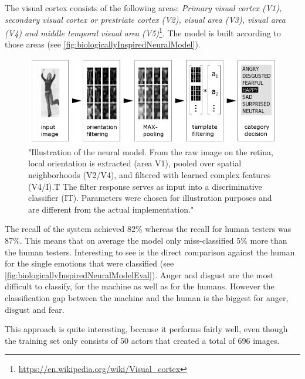 \documentclass[conference]{IEEEtran}
\begin{document}
The visual cortex consists of the following areas: \emph{Primary visual cortex (V1), secondary visual cortex or prestriate cortex (V2), visual area (V3), visual area (V4) and middle temporal visual area (V5)}\footnote{\url{https://en.wikipedia.org/wiki/Visual_cortex}}. The model is built according to those areas (see \autoref{fig:biologicallyInspiredNeuralModel}). 
\begin{figure}[H]
\centering
\includegraphics[width=\linewidth]{biologicallyInspiredNeuralModel.jpg}
\caption{"Illustration of the neural model. From the raw image on the retina, local orientation is extracted (area V1), pooled over spatial neighborhoods (V2/V4), and filtered with learned complex features (V4/I).T The filter response serves as input
into a discriminative classifier (IT). Parameters were chosen for illustration purposes and are different from the actual implementation."\cite{schindler2008recognizing}}
\label{fig:biologicallyInspiredNeuralModel}
\end{figure}

The recall of the system achieved 82\% whereas the recall for human testers was 87\%. This means that on average the model only miss-classified 5\% more than the human testers. Interesting to see is the direct comparison against the human for the single emotions that were classified (see \autoref{fig:biologicallyInspiredNeuralModelEval}). Anger and disgust are the most difficult to  classify, for the machine as well as for the humans. However the classification gap between the machine and the human is the biggest for anger, disgust and fear.

This approach is quite interesting, because it performs fairly well, even though the training set only consists of 50 actors that created a total of 696 images.
\end{document}
